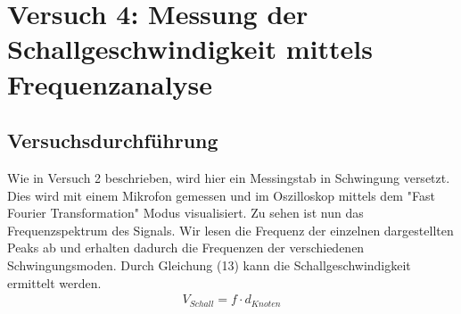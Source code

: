 \documentclass{scrartcl}
\begin{document}
\section{Versuch 4: Messung der Schallgeschwindigkeit mittels Frequenzanalyse}
\subsection{Versuchsdurchführung}
Wie in Versuch 2 beschrieben, wird hier ein Messingstab in Schwingung versetzt. Dies wird mit einem Mikrofon gemessen und im Oszilloskop mittels dem "Fast Fourier Transformation" Modus visualisiert. Zu sehen ist nun das Frequenzspektrum des Signals. Wir lesen die Frequenz der einzelnen dargestellten Peaks ab und erhalten dadurch die Frequenzen der verschiedenen Schwingungsmoden. Durch Gleichung (13) kann die Schallgeschwindigkeit ermittelt werden.\begin{align}
V_{Schall} = f \cdot d_{Knoten}
\end{align}
\end{document}
